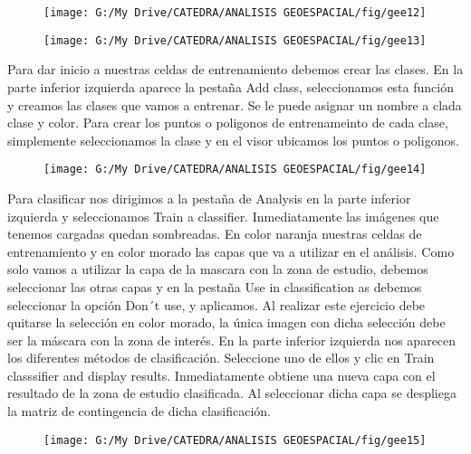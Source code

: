 \documentclass[a4paper,oneside,11pt,]{article}
\begin{document}
\begin{figure}
\centering
\texttt{[image: G:/My Drive/CATEDRA/ANALISIS GEOESPACIAL/fig/gee12]}
\end{figure}

\begin{figure}
\centering
\texttt{[image: G:/My Drive/CATEDRA/ANALISIS GEOESPACIAL/fig/gee13]}
\end{figure}

Para dar inicio a nuestras celdas de entrenamiento debemos crear las clases. En la parte inferior izquierda aparece la pestaña Add class, seleccionamos esta función y creamos las clases que vamos a entrenar. Se le puede asignar un nombre a clada clase y color.
Para crear los puntos o poligonos de entrenameinto de cada clase, simplemente seleccionamos la clase y en el visor ubicamos los puntos o poligonos.


\begin{figure}
\centering
\texttt{[image: G:/My Drive/CATEDRA/ANALISIS GEOESPACIAL/fig/gee14]}
\end{figure}

Para clasificar nos dirigimos a la pestaña de Analysis en la parte inferior izquierda y seleccionamos Train a classifier. Inmediatamente las imágenes que tenemos cargadas quedan sombreadas. En color naranja nuestras celdas de entrenamiento y en color morado las capas que va a utilizar en el análisis. Como solo vamos a utilizar la capa de la mascara con la zona de estudio, debemos seleccionar las otras capas y en la pestaña Use in classification as debemos seleccionar la opción Don´t use, y aplicamos. Al realizar este ejercicio debe quitarse la selección en color morado, la única imagen con dicha selección debe ser la máscara con la zona de interés.
En la parte inferior izquierda nos aparecen los diferentes métodos de clasificación. Seleccione uno de ellos y clic en Train classsifier and display results. Inmediatamente obtiene una nueva capa con el resultado de la zona de estudio clasificada. Al seleccionar dicha capa se despliega la matriz de contingencia de dicha clasificación.

\begin{figure}
\centering
\texttt{[image: G:/My Drive/CATEDRA/ANALISIS GEOESPACIAL/fig/gee15]}
\end{figure}
\end{document}
